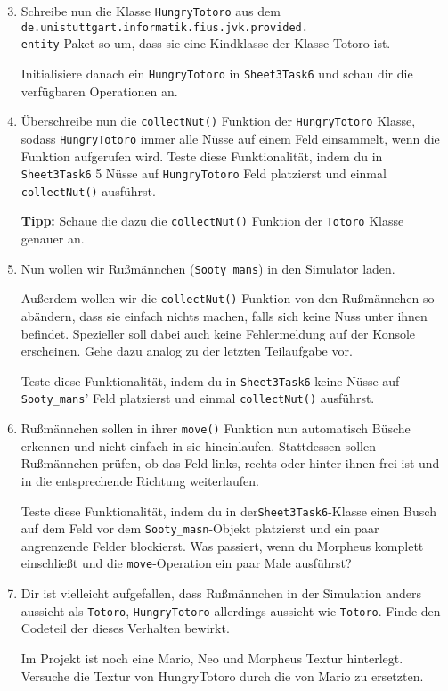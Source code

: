 \begin{enumerate}\setcounter{enumi}{2}
\item Schreibe nun die Klasse \lstinline{HungryTotoro} aus dem \texttt{de.unistuttgart.informatik.fius.jvk.provided.}\\\texttt{entity}-Paket so um, dass sie eine Kindklasse der Klasse Totoro ist.

Initialisiere danach ein \lstinline{HungryTotoro} in \lstinline{Sheet3Task6} und schau dir die verfügbaren Operationen an.

\item Überschreibe nun die \lstinline{collectNut()} Funktion der \lstinline{HungryTotoro} Klasse, sodass \lstinline{HungryTotoro} immer alle Nüsse auf einem Feld einsammelt, wenn die Funktion aufgerufen wird.
Teste diese Funktionalität, indem du in \lstinline{Sheet3Task6} 5 Nüsse auf \lstinline{HungryTotoro} Feld platzierst und einmal \lstinline{collectNut()} ausführst.

\textbf{Tipp:} Schaue die dazu die \lstinline{collectNut()} Funktion der \lstinline{Totoro} Klasse genauer an.

\item Nun wollen wir Rußmännchen (\lstinline{Sooty_mans}) in den Simulator laden.

Außerdem wollen wir die \lstinline{collectNut()} Funktion von den Rußmännchen so abändern, dass sie einfach nichts machen, falls sich keine Nuss unter ihnen befindet.
Spezieller soll dabei auch keine Fehlermeldung auf der Konsole erscheinen.
Gehe dazu analog zu der letzten Teilaufgabe vor.

Teste diese Funktionalität, indem du in \lstinline{Sheet3Task6} keine Nüsse auf \lstinline{Sooty_mans}' Feld platzierst und einmal \lstinline{collectNut()} ausführst.

\item Rußmännchen sollen in ihrer \lstinline{move()} Funktion nun automatisch Büsche erkennen und nicht einfach in sie hineinlaufen.
Stattdessen sollen Rußmännchen prüfen, ob das Feld links, rechts oder hinter ihnen frei ist und in die entsprechende Richtung weiterlaufen.

Teste diese Funktionalität, indem du in der\lstinline{Sheet3Task6}-Klasse einen Busch auf dem Feld vor dem \lstinline{Sooty_masn}-Objekt platzierst und ein paar angrenzende Felder blockierst.
Was passiert, wenn du Morpheus komplett einschließt und die \lstinline{move}-Operation ein paar Male ausführst?

\item \optional Dir ist vielleicht aufgefallen, dass Rußmännchen in der Simulation anders aussieht als \lstinline{Totoro}, \lstinline{HungryTotoro} allerdings aussieht wie \lstinline{Totoro}.
Finde den Codeteil der dieses Verhalten bewirkt.

Im Projekt ist noch eine Mario, Neo und Morpheus Textur hinterlegt.
Versuche die Textur von HungryTotoro durch die von Mario zu ersetzten.

\end{enumerate}
